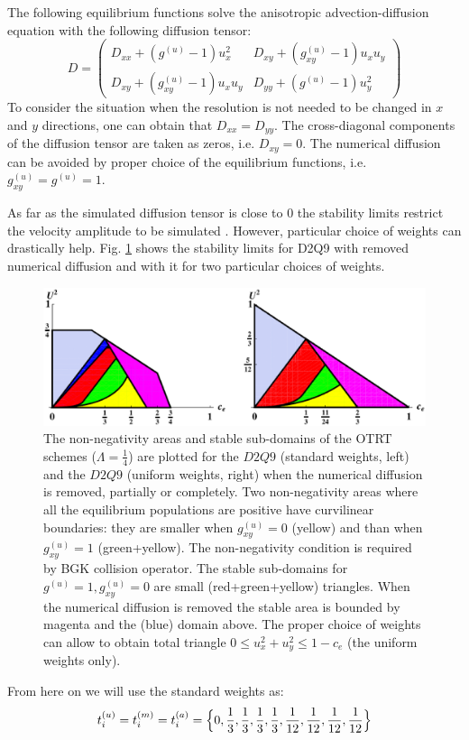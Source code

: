 \documentclass{article}
\begin{document}
The following equilibrium functions solve the anisotropic advection-diffusion equation with the
following diffusion tensor:
\begin{equation}
D=
\begin{pmatrix}
D_{xx} + (g^{(u)}-1) u_x^2 & D_{xy}+(g_{xy}^{(u)}-1)u_x u_y\\
D_{xy} + (g_{xy}^{(u)}-1) u_x u_y& D_{yy}+(g^{(u)}-1) u_y^2 
\end{pmatrix}
\end{equation}
To consider the situation when the resolution is not needed to be changed in $x$ and $y$
directions, one can obtain that $D_{xx}=D_{yy}$. The cross-diagonal components of the diffusion
tensor are taken as zeros, i.e. $D_{xy}=0$. The numerical diffusion can be avoided by proper choice
of the equilibrium functions, i.e. $g_{xy}^{(u)}=g^{(u)}=1$.

As far as the simulated diffusion tensor is close to $0$ the stability limits restrict the velocity
amplitude to be simulated \cite{kuzmin-stability-optimal}. However, particular choice of weights
can drastically help. Fig. \ref{stability:d2q9} shows the stability limits for D2Q9 with removed
numerical diffusion and with it for two particular choices of weights.
\begin{figure}[htb!]
\includegraphics[width=\textwidth]{Figures/d2q9_stability.eps}
\caption{The non-negativity areas and stable sub-domains of the OTRT schemes ($\Lambda=\frac{1}{4}$)
are plotted for the $D2Q9$ (standard weights, left) and the $D2Q9$ (uniform weights, right) when the
numerical diffusion is removed, partially or completely. Two non-negativity areas where all the
equilibrium populations are positive have curvilinear boundaries: they are smaller when
$g^{(u)}_{xy}=0$ (yellow) and than when $g^{(u)}_{xy}=1$ (green+yellow). The non-negativity
condition is required by BGK collision operator. The stable sub-domains for $g^{(u)} = 1,
g^{(u)}_{xy} = 0$ are small (red+green+yellow) triangles. When the numerical diffusion is removed
the stable area is bounded by magenta and the (blue) domain above. The proper choice of weights can
allow to obtain  total triangle $0 \leq u_x^2+u_y^2 \leq 1−c_e$ (the
uniform weights only).
\label{stability:d2q9}}
\end{figure}

From here on we will use the standard weights as:
\begin{equation}
t_i^{(u)}=t_i^{(m)}=t_i^{(a)}=\Bigl\{0,\frac{1}{3},\frac{1}{3},\frac{1}{3},\frac{1}{3},\frac{1}{12},
\frac {1}{12},\frac{1}{12},\frac{1}{12}\Bigr\}
\end{equation}



\end{document}
